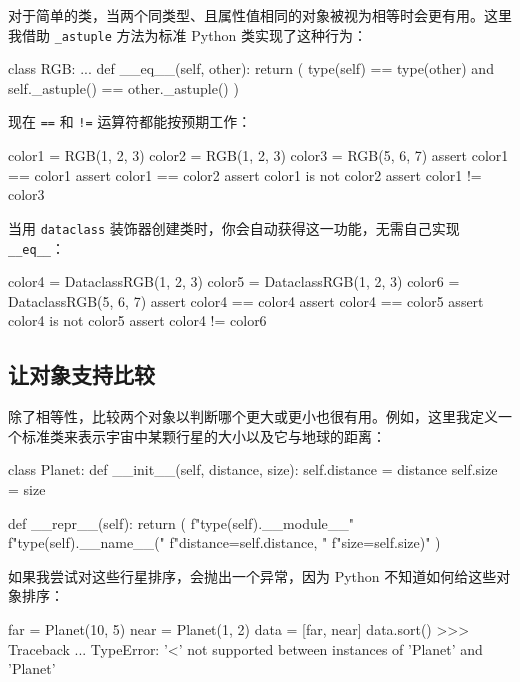 对于简单的类，当两个同类型、且属性值相同的对象被视为相等时会更有用。这里我借助 \texttt{\_astuple} 方法为标准 Python 类实现了这种行为：

\begin{codebox}[python]
class RGB:
    ...
    def __eq__(self, other):
        return (
            type(self) == type(other)
            and self._astuple() == other._astuple()
        )
\end{codebox}

现在 \texttt{==} 和 \texttt{!=} 运算符都能按预期工作：

\begin{codebox}[python]
color1 = RGB(1, 2, 3)
color2 = RGB(1, 2, 3)
color3 = RGB(5, 6, 7)
assert color1 == color1
assert color1 == color2
assert color1 is not color2
assert color1 != color3
\end{codebox}

当用 \texttt{dataclass} 装饰器创建类时，你会自动获得这一功能，无需自己实现 \texttt{\_\_eq\_\_}：

\begin{codebox}[python]
color4 = DataclassRGB(1, 2, 3)
color5 = DataclassRGB(1, 2, 3)
color6 = DataclassRGB(5, 6, 7)
assert color4 == color4
assert color4 == color5
assert color4 is not color5
assert color4 != color6
\end{codebox}

\subsection{让对象支持比较}

除了相等性，比较两个对象以判断哪个更大或更小也很有用。例如，这里我定义一个标准类来表示宇宙中某颗行星的大小以及它与地球的距离：

\begin{codebox}[python]
class Planet:
    def __init__(self, distance, size):
        self.distance = distance
        self.size = size

    def __repr__(self):
        return (
            f"{type(self).__module__}"
            f"{type(self).__name__}("
            f"distance={self.distance}, "
            f"size={self.size})"
        )
\end{codebox}

如果我尝试对这些行星排序，会抛出一个异常，因为 Python 不知道如何给这些对象排序：

\begin{codebox}[python]
far = Planet(10, 5)
near = Planet(1, 2)
data = [far, near]
data.sort()
>>>
Traceback ...
TypeError: '<' not supported between instances of 'Planet' and
'Planet'
\end{codebox}

